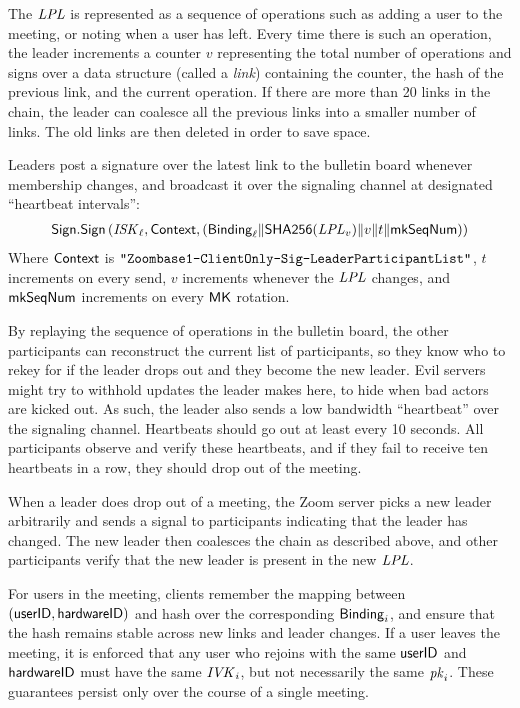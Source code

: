 The $\mathit{LPL}$ is represented as a sequence of operations such as adding a user to the meeting, or
noting when a user has left. Every time there is such an operation, the leader increments a counter
$v$ representing the total number of operations and signs over a data structure (called a
\textit{link}) containing the counter, the hash of the previous link, and the current operation. If
there are more than 20 links in the chain, the leader can coalesce all the previous links into a
smaller number of links. The old links are then deleted in order to save space.

Leaders post a signature over the latest link to the bulletin board whenever membership changes, and
broadcast it over the signaling channel at designated ``heartbeat intervals'':
%
\begin{align*}
{\sf Sign}.\mathsf{Sign} \left(\mathit{ISK}_{\ell}, {\sf Context}, ({\sf Binding}_{\ell} \| \mathsf{SHA256}(\mathit{LPL}_v) \| v \| t \| \mathsf{mkSeqNum} ) \right)
\end{align*}
%
Where ${\sf Context}$ is $\texttt{"Zoombase1-ClientOnly-Sig-Leader\-Participant\-List"}$, $t$ increments
on every send, $v$ increments whenever the $\mathit{LPL}$ changes, and $\mathsf{mkSeqNum}$ increments on
every ${\sf MK}$ rotation.

By replaying the sequence of operations in the bulletin board, the other participants can
reconstruct the current list of participants, so they know who to rekey for if the leader drops out
and they become the new leader. Evil servers might try to withhold updates the leader makes here, to
hide when bad actors are kicked out. As such, the leader also sends a low bandwidth ``heartbeat''
over the signaling channel. Heartbeats should go out at least every 10 seconds. All participants
observe and verify these heartbeats, and if they fail to receive ten heartbeats in a row, they
should drop out of the meeting.

When a leader does drop out of a meeting, the Zoom server picks a new leader arbitrarily and sends a
signal to participants indicating that the leader has changed. The new leader then coalesces the
chain as described above, and other participants verify that the new leader is present in the new
$\mathit{LPL}$.

For users in the meeting, clients remember the mapping between $(\mathsf{userID}, {\sf hardwareID})$ and hash
over the corresponding ${\sf Binding}_i$, and ensure that the hash remains stable across new links and
leader changes. If a user leaves the meeting, it is enforced that any user who rejoins with the same
$\mathsf{userID}$ and ${\sf hardwareID}$ must have the same $\mathit{IVK}_i$, but not necessarily the same $\mathit{pk}_i$. These
guarantees persist only over the course of a single meeting.

